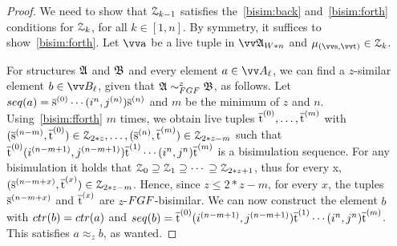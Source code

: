 \begin{proof}
  We need to show that $\mathcal{Z}_{k-1}$ satisfies the~\ref{bisim:back} and~\ref{bisim:forth} conditions for $\mathcal{Z}_{k}$, for all $k \in [1, n]$.
  By symmetry, it suffices to show~\ref{bisim:forth}.
  Let $\elemtuptuplea$ be a live tuple in $\unravel{A}_{W * n}$ and $\mu_{(\elemtuptuples, \elemtuptuplet)} \in \bisimZ_{k}$.

  For structures ${\mathfrak{A}}$ and ${\mathfrak{B}}$ and every element $a \in \unraveldom{A}_{\ell}$, we can find a $z$-similar element $b \in \unraveldom{B}_{\ell}$, given that $\str{A} \bisimto_{\FGF}^{z} \str{B}$, as follows.
  Let $\seq{a} = \elemtuples^{(0)}\cdots(i^{{n}}, j^{(n)})\elemtuples^{(n)}$ and $m$ be the minimum of $z$ and $n$.
  Using~\ref{bisim:fforth} $m$ times, we obtain live tuples $\overline{\mathrm{t}}^{(0)}, \ldots, \overline{\mathrm{t}}^{(m)}$ with $(\overline{\mathrm{s}}^{(n-m)}, \overline{\mathrm{t}}^{(0)}) \in \mathcal{Z}_{2*z}, \ldots, (\overline{\mathrm{s}}^{(n)}, \overline{\mathrm{t}}^{(m)}) \in \mathcal{Z}_{2*z - m}$ such that $\overline{\mathrm{t}}^{(0)}(i^{(n-m+1)}, j^{(n-m+1)})\overline{\mathrm{t}}^{(1)}\cdots{}(i^{n}, j^{n})\overline{\mathrm{t}}^{(m)}$ is a bisimulation sequence.
  For any bisimulation it holds that $\mathcal{Z}_{0} \supseteq \mathcal{Z}_{1} \supseteq \cdots{} \supseteq \mathcal{Z}_{2*z+1}$, thus for every x, $(\overline{\mathrm{s}}^{(n-m+x)}, \overline{\mathrm{t}}^{(x)}) \in \mathcal{Z}_{2*z - m}$.
  Hence, since $z \le 2*z - m$, for every $x$, the tuples $\overline{\mathrm{s}}^{(n-m+x)}$ and $\overline{\mathrm{t}}^{(x)}$ are $z$-$\FGF$-bisimilar.
  We can now construct the element $b$ with $\ctr{b} = \ctr{a}$ and $\seq{b} = \elemtuplet^{(0)}(i^{(n-m+1)}, j^{(n-m+1)})\elemtuplet^{(1)}\cdots{}(i^{n}, j^{n})\elemtuplet^{(m)}$.
  This satisfies $a \approx_{z} b$, as wanted.
\end{proof}
